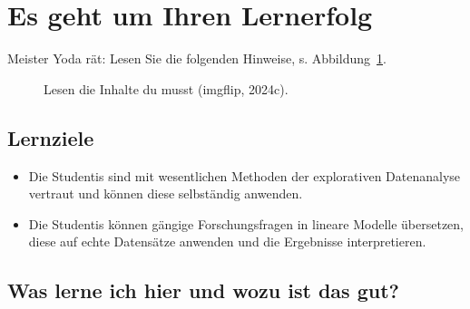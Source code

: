 \documentclass[
  letterpaper,
  oneside,
  open=any]{scrbook}
\theoremstyle{definition}
\theoremstyle{definition}
\theoremstyle{definition}
\theoremstyle{remark}
\begin{document}
\section{Es geht um Ihren Lernerfolg}\label{es-geht-um-ihren-lernerfolg}

Meister Yoda rät: Lesen Sie die folgenden Hinweise, s.
Abbildung~\ref{fig-yoda}.

\begin{figure}


\caption{\label{fig-yoda}Lesen die Inhalte du musst (imgflip, 2024c).}

\end{figure}%

\subsection{Lernziele}\label{lernziele}

\begin{itemize}
\item
  Die Studentis sind mit wesentlichen Methoden der explorativen
  Datenanalyse vertraut und können diese selbständig anwenden.
\item
  Die Studentis können gängige Forschungsfragen in lineare Modelle
  übersetzen, diese auf echte Datensätze anwenden und die Ergebnisse
  interpretieren.
\end{itemize}

\subsection{Was lerne ich hier und wozu ist das
gut?}\label{was-lerne-ich-hier-und-wozu-ist-das-gut}
\end{document}
